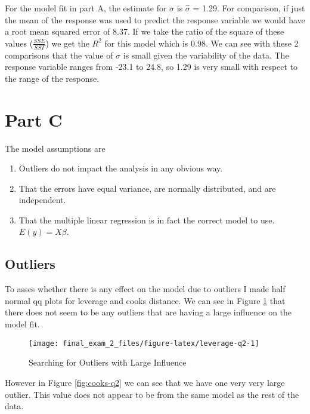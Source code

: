 \documentclass[]{book}
\begin{document}
For the model fit in part A, the estimate for \(\sigma\) is \(\hat{\sigma}\) = 1.29. For comparison, if just the mean of the response was used to predict the response variable we would have a root mean squared error of 8.37. If we take the ratio of the square of these values (\(\frac{SSE}{SST}\)) we get the \(R^2\) for this model which is 0.98. We can see with these 2 comparisons that the value of \(\sigma\) is small given the variability of the data. The response variable ranges from -23.1 to 24.8, so 1.29 is very small with respect to the range of the response.

\hypertarget{part-c-1}{%
\section{Part C}\label{part-c-1}}

The model assumptions are

\begin{enumerate}
\def\labelenumi{\arabic{enumi}.}
\item
  Outliers do not impact the analysis in any obvious way.
\item
  That the errors have equal variance, are normally distributed, and are independent.
\item
  That the multiple linear regression is in fact the correct model to use. \(E(y) = X \beta\).
\end{enumerate}

\hypertarget{outliers}{%
\subsection{Outliers}\label{outliers}}

To asses whether there is any effect on the model due to outliers I made half normal qq plots for leverage and cooks distance. We can see in Figure \ref{fig:leverage-q2} that there does not seem to be any outliers that are having a large influence on the model fit.

\begin{figure}

{\centering \texttt{[image: final\_exam\_2\_files/figure-latex/leverage-q2-1]} 

}

\caption{Searching for Outliers with Large Influence}\label{fig:leverage-q2}
\end{figure}

However in Figure \ref{fig:cooks-q2} we can see that we have one very very large outlier. This value does not appear to be from the same model as the rest of the data.
\end{document}
